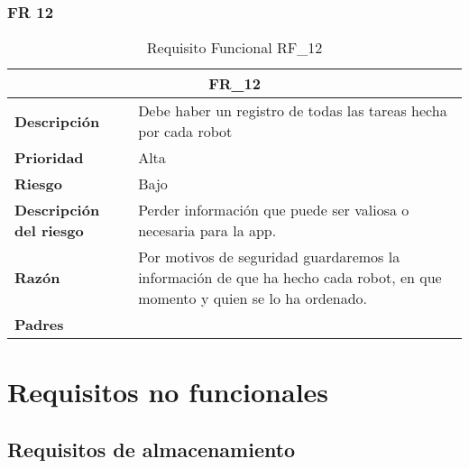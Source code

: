 \documentclass{scrreprt}
\begin{document}
\subsection{FR 12}
    \begin{table}[H]
        \label{tab:my-table}
        \begin{tabular}{|p{5cm}|p{11cm}|}
        \hline
        \multicolumn{2}{|c|}{\textbf{FR_12}} \\
        \hline
        \textbf{Descripción  }                      &  Debe haber un registro de todas las tareas hecha por cada robot                                              \\ \hline
        \textbf{Prioridad}                          & Alta                                                                                              \\ \hline
        \textbf{Riesgo}                          & Bajo                                                                                                \\ \hline
        \textbf{Descripción del riesgo}                    &  Perder información que puede ser valiosa o necesaria para la app.                                \\ \hline
        \textbf{Razón}                   & Por motivos de seguridad guardaremos la información de que ha hecho cada robot, en que momento y quien se lo ha ordenado.                                                                                                      \\ \hline
        \textbf{Padres}                               &  \\  \hline
        \end{tabular}%
        
        \caption{Requisito Funcional RF_12}
\end{table}

\chapter{Requisitos no funcionales}

\section{Requisitos de almacenamiento}
\end{document}
